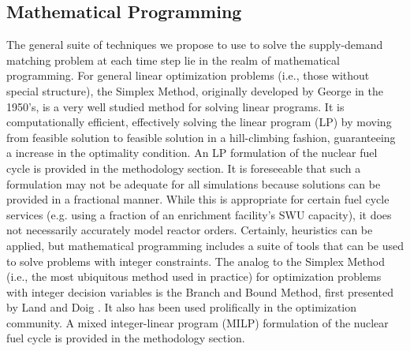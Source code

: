 \subsection{Mathematical Programming}

The general suite of techniques we propose to use to solve the supply-demand
matching problem at each time step lie in the realm of mathematical
programming. For general linear optimization problems (i.e., those without
special structure), the Simplex Method, originally developed by
George \cite{dantzig_generalized_1955} in the 1950's, is a very well studied
method for solving linear programs. It is computationally efficient, effectively
solving the linear program (LP) by moving from feasible solution to feasible
solution in a hill-climbing fashion, guaranteeing a increase in the optimality
condition. An LP formulation of the nuclear fuel cycle is provided in the
methodology section. It is foreseeable that such a formulation may not be adequate
for all simulations because solutions can be provided in a fractional
manner. While this is appropriate for certain fuel cycle services (e.g. using a
fraction of an enrichment facility's SWU capacity), it does not necessarily
accurately model reactor orders. Certainly, heuristics can be applied, but
mathematical programming includes a suite of tools that can be used to solve
problems with integer constraints. The analog to the Simplex Method (i.e., the
most ubiquitous method used in practice) for optimization problems with integer
decision variables is the Branch and Bound Method, first presented by Land and
Doig \cite{land_automatic_1960}. It also has been used prolifically in the
optimization community. A mixed integer-linear program (MILP) formulation of the
nuclear fuel cycle is provided in the methodology section.


